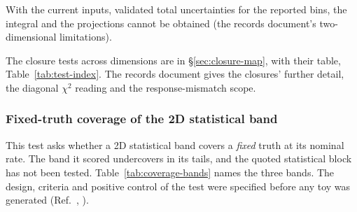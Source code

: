 With the current inputs, validated total uncertainties for the reported bins, the integral and the projections cannot be obtained (the records document's two-dimensional limitations).

The closure tests across dimensions are in \S\ref{sec:closure-map}, with their table, Table~\ref{tab:test-index}. The records document gives the closures' further detail, the diagonal $\chi^{2}$ reading and the response-mismatch scope.

\subsubsection{Fixed-truth coverage of the 2D statistical band}
\label{sec:coverage}
This test asks whether a 2D statistical band covers a \emph{fixed} truth at its nominal rate. The band it scored undercovers in its tails, and the quoted statistical block has not been tested. Table~\ref{tab:coverage-bands} names the three bands. The design, criteria and positive control of the test were specified before any toy was generated (Ref.~\cite{NoteRecords2026}, ).

